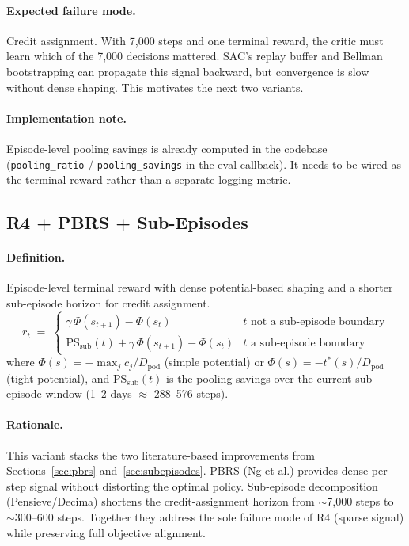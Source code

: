 \documentclass[11pt]{article}
\begin{document}
\paragraph{Expected failure mode.}
Credit assignment.  With 7{,}000 steps and one terminal reward, the critic
must learn which of the 7{,}000 decisions mattered.  SAC's replay buffer
and Bellman bootstrapping can propagate this signal backward, but
convergence is slow without dense shaping.  This motivates the next two
variants.

\paragraph{Implementation note.}
Episode-level pooling savings is already computed in the codebase
(\texttt{pooling\_ratio} / \texttt{pooling\_savings} in the eval callback).
It needs to be wired as the terminal reward rather than a separate logging
metric.

\subsection{R4 + PBRS + Sub-Episodes}
\label{sec:r4pbrs}

\paragraph{Definition.}
Episode-level terminal reward with dense potential-based shaping and a
shorter sub-episode horizon for credit assignment.
\begin{equation}
\boxed{
  r_t
  \;=\;
  \begin{cases}
    \gamma\,\Phi(s_{t+1}) - \Phi(s_t)
      & t \text{ not a sub-episode boundary} \\[6pt]
    \mathrm{PS}_{\text{sub}}(t)
      + \gamma\,\Phi(s_{t+1}) - \Phi(s_t)
      & t \text{ a sub-episode boundary}
  \end{cases}
}
\label{eq:r4pbrs}
\end{equation}
where $\Phi(s) = -\max_j c_j / D_{\text{pod}}$ (simple potential) or
$\Phi(s) = -t^*(s)/D_{\text{pod}}$ (tight potential), and
$\mathrm{PS}_{\text{sub}}(t)$ is the pooling savings over the current
sub-episode window (1--2 days $\approx$ 288--576 steps).

\paragraph{Rationale.}
This variant stacks the two literature-based improvements from
Sections~\ref{sec:pbrs} and~\ref{sec:subepisodes}.  PBRS (Ng et al.)
provides dense per-step signal without distorting the optimal policy.
Sub-episode decomposition (Pensieve/Decima) shortens the credit-assignment
horizon from $\sim$7{,}000 steps to $\sim$300--600 steps.  Together they
address the sole failure mode of R4 (sparse signal) while preserving full
objective alignment.
\end{document}
